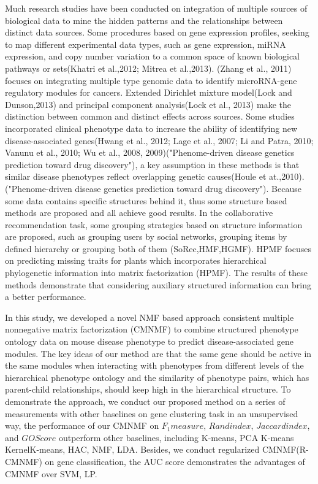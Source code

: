 \documentclass{bmcart}
\begin{document}
Much research studies have been conducted on integration of multiple sources of biological data to mine the hidden patterns and the relationships between distinct data sources. Some procedures based on gene expression profiles, seeking to map different experimental data types, such as gene expression, miRNA expression, and copy number variation to a common space of known biological pathways or sets(Khatri et al.,2012; Mitrea et al.,2013). (Zhang et al., 2011) focuses on integrating multiple type genomic data to identify microRNA-gene regulatory modules for cancers. Extended Dirichlet mixture model(Lock and Dunson,2013) and principal component analysis(Lock et al., 2013) make the distinction between common and distinct effects across sources. Some studies incorporated clinical phenotype data to increase the ability of identifying new disease-associated genes(Hwang et al., 2012; Lage et al., 2007; Li and Patra, 2010; Vanunu et al., 2010; Wu et al., 2008, 2009)("Phenome-driven disease genetics prediction toward drug discovery"), a key assumption in these methods is that  similar disease phenotypes reflect overlapping genetic causes(Houle et at.,2010).("Phenome-driven disease genetics prediction toward drug discovery"). Because some data contains specific structures behind it, thus some structure based methods are proposed and all achieve good results. In the collaborative recommendation task, some grouping strategies based on structure information are proposed, such as grouping users by social networks, grouping items by defined hierarchy or grouping both of them (SoRec,HMF,HGMF). HPMF focuses on predicting missing traits for plants which incorporates hierarchical phylogenetic information into matrix factorization (HPMF). The results of these methods demonstrate that considering auxiliary structured information can bring a better performance.

In this study, we developed a novel NMF based approach consistent multiple nonnegative matrix factorization (CMNMF) to combine structured phenotype ontology data on mouse disease phenotype to predict disease-associated gene modules. The key ideas of our method are that the same gene should be active in the same modules when interacting with phenotypes from different levels of the hierarchical phenotype ontology  and the similarity of phenotype pairs, which has parent-child relationships, should keep high in the hierarchical structure. To demonstrate the approach, we conduct our proposed method on a series of measurements with other baselines on gene clustering task in an unsupervised way, the performance of our CMNMF on $F_1 measure$, $Rand index$, $Jaccard index$, and $GO Score$ outperform other baselines, including K-means, PCA K-means KernelK-means, HAC, NMF, LDA. Besides, we conduct regularized CMNMF(R-CMNMF) on gene classification, the AUC score demonstrates the advantages of CMNMF over SVM, LP.
\end{document}
